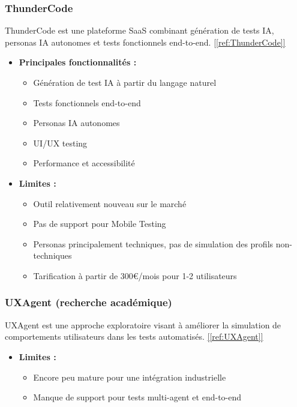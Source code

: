 \subsubsection{ThunderCode}
ThunderCode est une plateforme SaaS combinant génération de tests IA, personas IA autonomes et tests fonctionnels end-to-end. 
\hyperlink{ref:ThunderCode}{[\ref{ref:ThunderCode}]}  

\begin{itemize}
    \item \textbf{Principales fonctionnalités :}
    \begin{itemize}
        \item Génération de test IA à partir du langage naturel
        \item Tests fonctionnels end-to-end
        \item Personas IA autonomes
        \item UI/UX testing
        \item Performance et accessibilité
    \end{itemize}
    \item \textbf{Limites :}
    \begin{itemize}
        \item Outil relativement nouveau sur le marché
        \item Pas de support pour Mobile Testing
        \item Personas principalement techniques, pas de simulation des profils non-techniques
        \item Tarification à partir de 300€/mois pour 1-2 utilisateurs
    \end{itemize}
\end{itemize}

\subsubsection{UXAgent (recherche académique)}
UXAgent est une approche exploratoire visant à améliorer la simulation de comportements utilisateurs dans les tests automatisés. 
\hyperlink{ref:UXAgent}{[\ref{ref:UXAgent}]}  

\begin{itemize}
    \item \textbf{Limites :}
    \begin{itemize}
        \item Encore peu mature pour une intégration industrielle
        \item Manque de support pour tests multi-agent et end-to-end
    \end{itemize}
\end{itemize}

